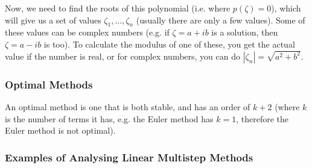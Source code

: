 Now, we need to find the roots of this polynomial (i.e. where
$p(\zeta) = 0$), which will give us a set of values
$\zeta_1,\dots,\zeta_n$ (usually there are only a few values). Some of
these values can be complex numbers (e.g. if $\zeta = a + ib$ is a
solution, then $\zeta = a - ib$ is too). To calculate the modulus of
one of these, you get the actual value if the number is real, or for
complex numbers, you can do $|\zeta_n| = \sqrt{a^2 + b^2}$.

\subsubsection{Optimal Methods}

An optimal method is one that is both stable, and has an order of $k +
2$ (where $k$ is the number of terms it has, e.g. the Euler method has
$k = 1$, therefore the Euler method is not optimal).


\subsubsection{Examples of Analysing Linear Multistep Methods}

